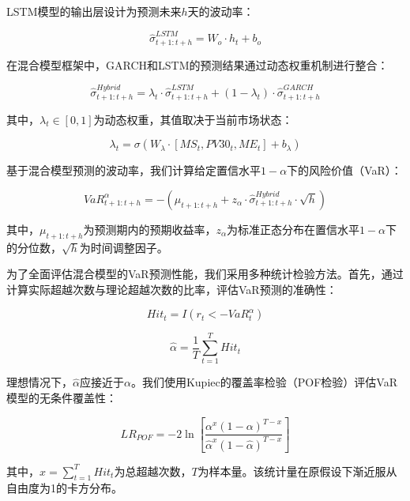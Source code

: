\documentclass[12pt, a4paper]{article}
\begin{document}
LSTM模型的输出层设计为预测未来$h$天的波动率：

\begin{equation}
\hat{\sigma}_{t+1:t+h}^{LSTM} = W_o \cdot h_t + b_o
\end{equation}

在混合模型框架中，GARCH和LSTM的预测结果通过动态权重机制进行整合：

\begin{equation}
\hat{\sigma}_{t+1:t+h}^{Hybrid} = \lambda_t \cdot \hat{\sigma}_{t+1:t+h}^{LSTM} + (1 - \lambda_t) \cdot \hat{\sigma}_{t+1:t+h}^{GARCH}
\end{equation}

其中，$\lambda_t \in [0,1]$为动态权重，其值取决于当前市场状态：

\begin{equation}
\lambda_t = \sigma\left(W_{\lambda} \cdot [MS_t, PV30_t, ME_t] + b_{\lambda}\right)
\end{equation}

基于混合模型预测的波动率，我们计算给定置信水平$1-\alpha$下的风险价值（VaR）：

\begin{equation}
VaR_{t+1:t+h}^{\alpha} = -(\mu_{t+1:t+h} + z_{\alpha} \cdot \hat{\sigma}_{t+1:t+h}^{Hybrid} \cdot \sqrt{h})
\end{equation}

其中，$\mu_{t+1:t+h}$为预测期内的预期收益率，$z_{\alpha}$为标准正态分布在置信水平$1-\alpha$下的分位数，$\sqrt{h}$为时间调整因子。

为了全面评估混合模型的VaR预测性能，我们采用多种统计检验方法。首先，通过计算实际超越次数与理论超越次数的比率，评估VaR预测的准确性：

\begin{equation}
Hit_t = I(r_t < -VaR_t^{\alpha})
\end{equation}

\begin{equation}
\hat{\alpha} = \frac{1}{T} \sum_{t=1}^{T} Hit_t
\end{equation}

理想情况下，$\hat{\alpha}$应接近于$\alpha$。我们使用Kupiec的覆盖率检验（POF检验）评估VaR模型的无条件覆盖性：

\begin{equation}
LR_{POF} = -2\ln\left[\frac{\alpha^x (1-\alpha)^{T-x}}{{\hat{\alpha}}^x (1-\hat{\alpha})^{T-x}}\right]
\end{equation}

其中，$x = \sum_{t=1}^{T} Hit_t$为总超越次数，$T$为样本量。该统计量在原假设下渐近服从自由度为1的卡方分布。
\end{document}
